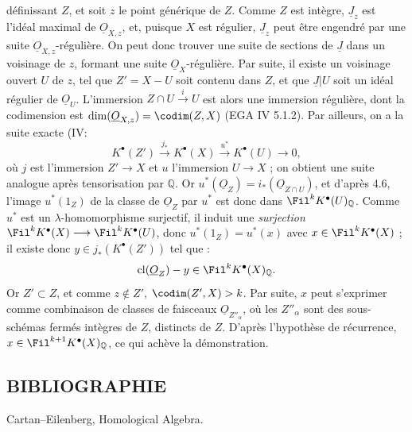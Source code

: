 
définissant \(Z\), et soit \(z\) le point générique de \(Z\). Comme \(Z\) est intègre, \(\underline{J}_z\) est l'idéal maximal de \(\underline{O}_{X,z}\), et, puisque \(X\) est régulier, \(\underline{J}_z\) peut être engendré par une suite \(\underline{O}_{X,z}\)-régulière. On peut donc trouver une suite de sections de \(\underline{J}\) dans un voisinage de \(z\), formant une suite \(\underline{O}_X\)-régulière. Par suite, il existe un voisinage ouvert \(U\) de \(z\), tel que \(Z'=X-U\) soit contenu dans \(Z\), et que \(\underline{J}|U\) soit un idéal régulier de \(\underline{O}_U\). L'immersion \(Z\cap U\xrightarrow{i}U\) est alors une immersion régulière, dont la codimension est \(\dim(\underline{O}_{X,z})=\codim(Z,X)\) (EGA IV 5.1.2). Par ailleurs, on a la suite exacte (IV\qquad :
\[
  K^{\bullet}(Z')\xrightarrow{j_*}K^{\bullet}(X)
  \xrightarrow{u^*}K^{\bullet}(U)\to0,
\]
où \(j\) est l'immersion \(Z'\to X\) et \(u\) l'immersion \(U\to X\) ; on obtient une suite analogue après tensorisation par \(\mathbb Q\). Or \(u^*(\underline{O}_Z)=i_*(\underline{O}_{Z\cap U})\), et d'après 4.6, l'image \(u^*(1_Z)\) de la classe de \(\underline{O}_Z\) par \(u^*\) est donc dans \(\Fil^kK^{\bullet}(U)_{\mathbb Q}\). Comme \(u^*\) est un \(\lambda\)-homomorphisme surjectif, il induit une \emph{surjection} \(\Fil^kK^{\bullet}(X)\longrightarrow \Fil^kK^{\bullet}(U)\), donc \(u^*(1_Z)=u^*(x)\) avec \(x\in\Fil^kK^{\bullet}(X)\) ; il existe donc \(y\in j_*(K^{\bullet}(Z'))\) tel que :
\[
  \operatorname{cl}(\underline{O}_Z)-y\in\Fil^kK^{\bullet}(X)_{\mathbb Q}.
\]
Or \(Z'\subset Z\), et comme \(z\notin Z'\), \(\codim(Z',X)>k\). Par suite, \(x\) peut s'exprimer comme combinaison de classes de faisceaux \(\underline{O}_{Z''_\alpha}\), où les \(Z''_\alpha\) sont des sous-schémas fermés intègres de \(Z\), distincts de \(Z\). D'après l'hypothèse de récurrence, \(x\in\Fil^{k+1}K^{\bullet}(X)_{\mathbb Q}\), ce qui achève la démonstration.

\subsection*{BIBLIOGRAPHIE}
\begin{enumerate}[label={[\arabic*]}]
\item Cartan--Eilenberg, Homological Algebra.
\end{enumerate}



\providecommand{\etale}{\'etale}
\providecommand{\Ch}{\operatorname{Ch}}



